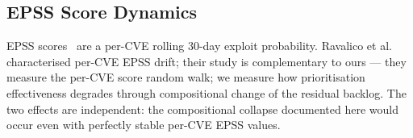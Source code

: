 \subsection{EPSS Score Dynamics}

EPSS scores~\cite{jacobs2021epss} are a per-CVE rolling 30-day exploit
probability. Ravalico et al.~\cite{ravalico2025epsstemporal} characterised
per-CVE EPSS drift; their study is complementary to ours --- they measure
the per-CVE score random walk; we measure how prioritisation effectiveness
degrades through compositional change of the residual backlog. The two
effects are independent: the compositional collapse documented here would
occur even with perfectly stable per-CVE EPSS values.
